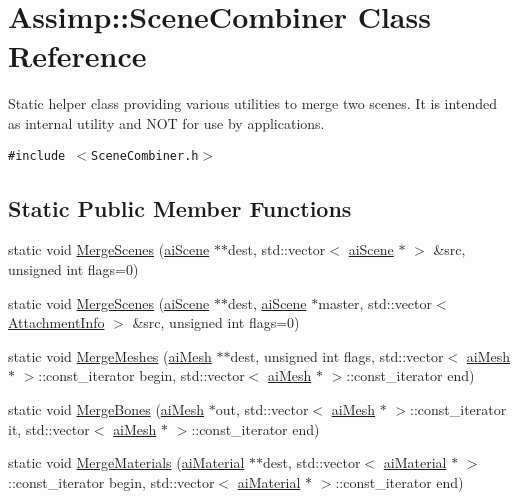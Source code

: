 \hypertarget{class_assimp_1_1_scene_combiner}{
\section{Assimp::SceneCombiner Class Reference}
\label{class_assimp_1_1_scene_combiner}
}
Static helper class providing various utilities to merge two scenes. It is intended as internal utility and NOT for use by applications.  


{\tt \#include $<$SceneCombiner.h$>$}

\subsection*{Static Public Member Functions}
\begin{CompactItemize}
\item 
static void \hyperlink{class_assimp_1_1_scene_combiner_b399fdea5846bc969a021a39f5a11276}{MergeScenes} (\hyperlink{structai_scene}{aiScene} $\ast$$\ast$dest, std::vector$<$ \hyperlink{structai_scene}{aiScene} $\ast$ $>$ \&src, unsigned int flags=0)
\item 
static void \hyperlink{class_assimp_1_1_scene_combiner_49af3c46e42d4da59bb1a488e517618c}{MergeScenes} (\hyperlink{structai_scene}{aiScene} $\ast$$\ast$dest, \hyperlink{structai_scene}{aiScene} $\ast$master, std::vector$<$ \hyperlink{struct_assimp_1_1_attachment_info}{AttachmentInfo} $>$ \&src, unsigned int flags=0)
\item 
static void \hyperlink{class_assimp_1_1_scene_combiner_3486044d9e2213bb8c408d8e8ef906f4}{MergeMeshes} (\hyperlink{structai_mesh}{aiMesh} $\ast$$\ast$dest, unsigned int flags, std::vector$<$ \hyperlink{structai_mesh}{aiMesh} $\ast$ $>$::const\_\-iterator begin, std::vector$<$ \hyperlink{structai_mesh}{aiMesh} $\ast$ $>$::const\_\-iterator end)
\item 
static void \hyperlink{class_assimp_1_1_scene_combiner_a42d5370510db89cbdd739617a617d4e}{MergeBones} (\hyperlink{structai_mesh}{aiMesh} $\ast$out, std::vector$<$ \hyperlink{structai_mesh}{aiMesh} $\ast$ $>$::const\_\-iterator it, std::vector$<$ \hyperlink{structai_mesh}{aiMesh} $\ast$ $>$::const\_\-iterator end)
\item 
static void \hyperlink{class_assimp_1_1_scene_combiner_9ebdb2b454f84032f2cfb51ebd7d5716}{MergeMaterials} (\hyperlink{structai_material}{aiMaterial} $\ast$$\ast$dest, std::vector$<$ \hyperlink{structai_material}{aiMaterial} $\ast$ $>$::const\_\-iterator begin, std::vector$<$ \hyperlink{structai_material}{aiMaterial} $\ast$ $>$::const\_\-iterator end)

\end{CompactItemize}
